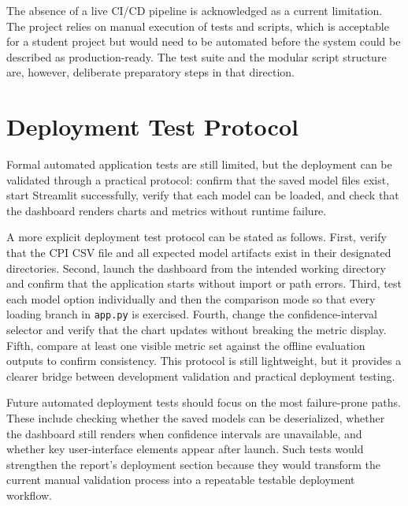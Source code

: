 The absence of a live CI/CD pipeline is acknowledged as a current limitation. The project relies on manual execution of tests and scripts, which is acceptable for a student project but would need to be automated before the system could be described as production-ready. The test suite and the modular script structure are, however, deliberate preparatory steps in that direction.

\section{Deployment Test Protocol}

Formal automated application tests are still limited, but the deployment can be validated through a practical protocol: confirm that the saved model files exist, start Streamlit successfully, verify that each model can be loaded, and check that the dashboard renders charts and metrics without runtime failure.

A more explicit deployment test protocol can be stated as follows. First, verify that the CPI CSV file and all expected model artifacts exist in their designated directories. Second, launch the dashboard from the intended working directory and confirm that the application starts without import or path errors. Third, test each model option individually and then the comparison mode so that every loading branch in \texttt{app.py} is exercised. Fourth, change the confidence-interval selector and verify that the chart updates without breaking the metric display. Fifth, compare at least one visible metric set against the offline evaluation outputs to confirm consistency. This protocol is still lightweight, but it provides a clearer bridge between development validation and practical deployment testing.

Future automated deployment tests should focus on the most failure-prone paths. These include checking whether the saved models can be deserialized, whether the dashboard still renders when confidence intervals are unavailable, and whether key user-interface elements appear after launch. Such tests would strengthen the report's deployment section because they would transform the current manual validation process into a repeatable testable deployment workflow.
